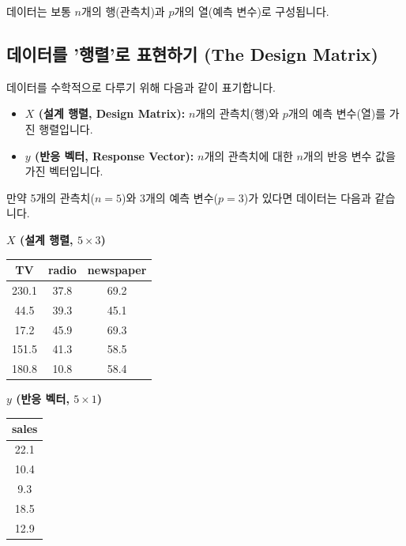 \documentclass[11pt,a4paper]{book}
\theoremstyle{definition}
\begin{document}
데이터는 보통 $n$개의 행(관측치)과 $p$개의 열(예측 변수)로 구성됩니다.

\subsection{데이터를 '행렬'로 표현하기 (The Design Matrix)}

데이터를 수학적으로 다루기 위해 다음과 같이 표기합니다.

\begin{itemize}
    \item \textbf{$X$ (설계 행렬, Design Matrix):} $n$개의 관측치(행)와 $p$개의 예측 변수(열)를 가진 행렬입니다.
    \item \textbf{$y$ (반응 벡터, Response Vector):} $n$개의 관측치에 대한 $n$개의 반응 변수 값을 가진 벡터입니다.
\end{itemize}

\begin{examplebox}[title={데이터의 형태: $X$와 $y$}]
만약 5개의 관측치($n=5$)와 3개의 예측 변수($p=3$)가 있다면 데이터는 다음과 같습니다.

\textbf{$X$ (설계 행렬, $5 \times 3$)}
\begin{tabular}{ccc}
    \toprule
    TV & radio & newspaper \\
    \midrule
    230.1 & 37.8 & 69.2 \\
    44.5 & 39.3 & 45.1 \\
    17.2 & 45.9 & 69.3 \\
    151.5 & 41.3 & 58.5 \\
    180.8 & 10.8 & 58.4 \\
    \bottomrule
\end{tabular}
\quad
\textbf{$y$ (반응 벡터, $5 \times 1$)}
\begin{tabular}{c}
    \toprule
    sales \\
    \midrule
    22.1 \\
    10.4 \\
    9.3 \\
    18.5 \\
    12.9 \\
    \bottomrule
\end{tabular}
\end{examplebox}
\end{document}
